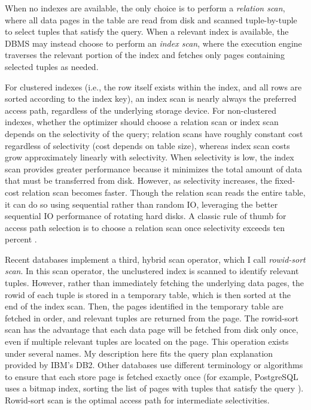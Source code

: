 When no indexes are available, the only choice is to perform a \emph{relation scan}, where all data pages in the table are read from disk and scanned tuple-by-tuple to select tuples that satisfy the query.
When a relevant index is available, the DBMS may instead choose to perform an \emph{index scan}, where the execution engine traverses the relevant portion of the index and fetches only pages containing selected tuples as needed.

For clustered indexes (i.e., the row itself exists within the index, and all rows are sorted according to the index key), an index scan is nearly always the preferred access path, regardless of the underlying storage device.  
For non-clustered indexes, whether the optimizer should choose a relation scan or index scan depends on the selectivity of the query; relation scans have roughly constant cost regardless of selectivity (cost depends on table size), whereas index scan costs grow approximately linearly with selectivity.
When selectivity is low, the index scan provides greater performance because it minimizes the total amount of data that must be transferred from disk.
However, as selectivity increases, the fixed-cost relation scan becomes faster.  
Though the relation scan reads the entire table, it can do so using sequential rather than random IO, leveraging the better sequential IO performance of rotating hard disks.
A classic rule of thumb for access path selection is to choose a relation scan once selectivity exceeds ten percent \cite{RamakrishnanAndGehrke}.

Recent databases implement a third, hybrid scan operator, which I call \emph{rowid-sort scan}.
In this scan operator, the unclustered index is scanned to identify relevant tuples.
However, rather than immediately fetching the underlying data pages, the rowid of each tuple is stored in a temporary table, which is then sorted at the end of the index scan.
Then, the pages identified in the temporary table are fetched in order, and relevant tuples are returned from the page.
The rowid-sort scan has the advantage that each data page will be fetched from disk only once, even if multiple relevant tuples are located on the page. 
This operation exists under several names.
My description here fits the query plan explanation provided by IBM's DB2.
Other databases use different terminology or algorithms to ensure that each store page is fetched exactly once (for example, PostgreSQL uses a bitmap index, sorting the list of pages with tuples that satisfy the query \cite{PostgresLossyBitMap}).
Rowid-sort scan is the optimal access path for intermediate selectivities.

